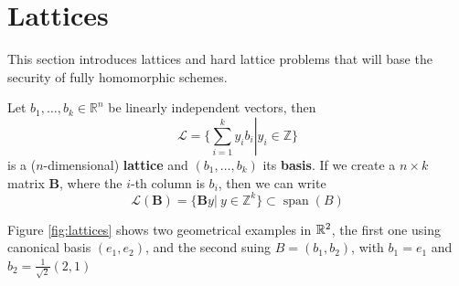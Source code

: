\section{Lattices}

This section introduces lattices and hard lattice problems that will base the security of fully homomorphic schemes.
\begin{definition}[Lattice]
Let $b_1,\ldots,b_k\in\mathbb{R}^n$ be linearly independent vectors, then
$$\mathcal{L}=\Big\{\sum_{i=1}^ky_ib_i\left|\right.y_i\in\mathbb{Z}\Big\}$$
is a ($n$-dimensional) \textbf{lattice} and $(b_1,\ldots,b_k)$ its \textbf{basis}. If we create a $n\times k$ matrix $\mathbf B$, where the $i$-th column is $b_i$, then we can write
$$\mathcal{L}(\mathbf B)=\{\mathbf B y| ~y\in \mathbb{Z}^k\}\subset \operatorname{span}(B)$$
\end{definition}
Figure \ref{fig:lattices} shows two geometrical examples in $\mathbb{R}^2$, the first one using canonical basis $(e_1,e_2)$, and the second suing $B=(b_1,b_2)$, with $b_1=e_1$ and $b_2=\frac{1}{\sqrt2}(2,1)$

